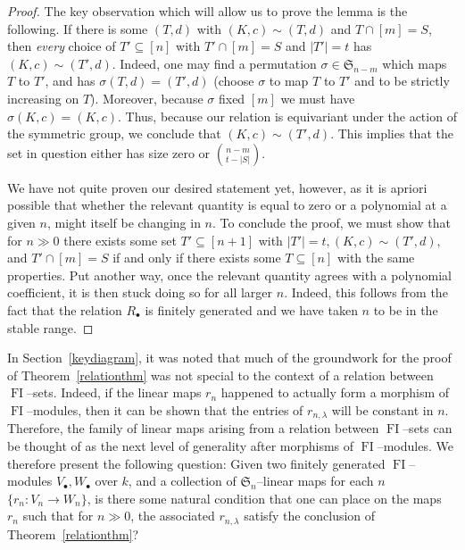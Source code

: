 \documentclass[ALCO,ThmDefs,Unicode,epreuves]{cedram}
\DeclareMathOperator{\FI}{FI}
\newcommand{\Sn}{\mathfrak{S}}
\newcommand{\dt}{\bullet}
\begin{document}
\begin{proof}
The key observation which will allow us to prove the lemma is the following. If there is some $(T,d)$ with $(K,c) \sim (T,d)$ and $T \cap [m] = S$, then \emph{every} choice of $T' \subseteq [n]$ with $T' \cap [m] = S$ and $|T'| = t$ has $(K,c) \sim (T',d)$. Indeed, one may find a permutation $\sigma \in \Sn_{n-m}$ which maps $T$ to $T'$, and has $\sigma(T,d) = (T',d)$ (choose $\sigma$ to map $T$ to $T'$ and to be strictly increasing on $T$). Moreover, because $\sigma$ fixed $[m]$ we must have $\sigma(K,c) = (K,c)$. Thus, because our relation is equivariant under the action of the symmetric group, we conclude that $(K,c) \sim (T',d)$. This implies that the set in question either has size zero or $\binom{n-m}{t-|S|}$.

We have not quite proven our desired statement yet, however, as it is apriori possible that whether the relevant quantity is equal to zero or a polynomial at a given $n$, might itself be changing in $n$. To conclude the proof, we must show that for $n \gg 0$ there exists some set $T' \subseteq [n+1]$ with $|T'| = t, (K,c) \sim (T',d),$ and $T' \cap [m] = S$ if and only if there exists some $T \subseteq [n]$ with the same properties. Put another way, once the relevant quantity agrees with a polynomial coefficient, it is then stuck doing so for all larger $n$. Indeed, this follows from the fact that the relation $R_\dt$ is finitely generated and we have taken $n$ to be in the stable range.
\end{proof}

\begin{remark}
In Section~\ref{keydiagram}, it was noted that much of the groundwork for the proof of Theorem~\ref{relationthm} was not special to the context of a relation between $\FI$--sets. Indeed, if the linear maps $r_n$ happened to actually form a morphism of $\FI$--modules, then it can be shown that the entries of $r_{n,\lambda}$ will be constant in $n$. Therefore, the family of linear maps arising from a relation between $\FI$--sets can be thought of as the next level of generality after morphisms of $\FI$--modules. We therefore present the following question: Given two finitely generated $\FI$--modules $V_\dt,W_\dt$ over $k$, and a collection of $\Sn_n$--linear maps for each $n$ $\{r_n:V_n \rightarrow W_n\}$, is there some natural condition that one can place on the maps $r_n$ such that for $n \gg 0$, the associated $r_{n,\lambda}$ satisfy the conclusion of Theorem~\ref{relationthm}?
\end{remark}
\end{document}
